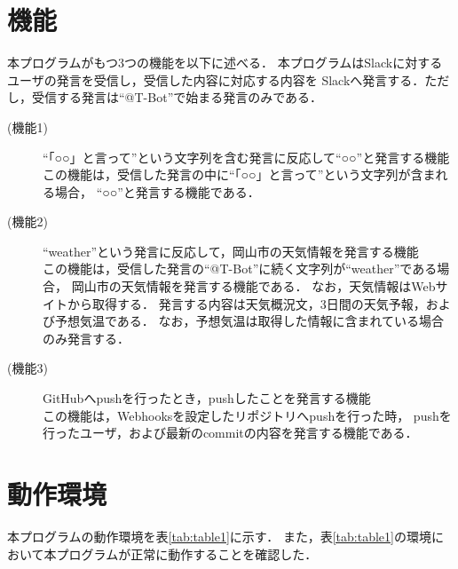 \documentclass[fleqn, 14pt]{sty/extarticlej}
\begin{document}
\section{機能}
\label{機能}
本プログラムがもつ3つの機能を以下に述べる．
本プログラムはSlackに対するユーザの発言を受信し，受信した内容に対応する内容を
Slackへ発言する．ただし，受信する発言は``@T-Bot''で始まる発言のみである．
\begin{description}
\item[(機能1)] ``「○○」と言って''という文字列を含む発言に反応して``○○''と発言する機能\\
  この機能は，受信した発言の中に``「○○」と言って''という文字列が含まれる場合，
  ``○○''と発言する機能である．
   
\item[(機能2)] ``weather''という発言に反応して，岡山市の天気情報を発言する機能\\
  この機能は，受信した発言の``@T-Bot''に続く文字列が``weather''である場合，
  岡山市の天気情報を発言する機能である．
  なお，天気情報はWebサイト\cite{weather}から取得する．
  発言する内容は天気概況文，3日間の天気予報，および予想気温である．
  なお，予想気温は取得した情報に含まれている場合のみ発言する．
  
\item[(機能3)] GitHubへpushを行ったとき，pushしたことを発言する機能\\
  この機能は，Webhooksを設定したリポジトリへpushを行った時，
  pushを行ったユーザ，および最新のcommitの内容を発言する機能である．
  
\end{description}

\section{動作環境}
\label{動作環境}
本プログラムの動作環境を表\ref{tab:table1}に示す．
また，表\ref{tab:table1}の環境において本プログラムが正常に動作することを確認した．
\begin{table}[tb]
  \begin{center}
    \caption{動作環境}
    \label{tab:table1}
    \vspace{0.3cm}
  \end{center}
\end{table}
\end{document}
